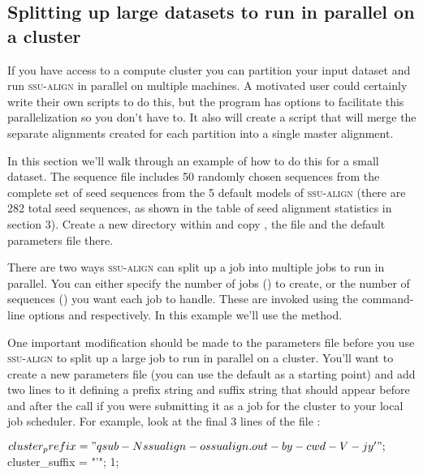 \subsection{Splitting up large datasets to run in parallel on a cluster}

If you have access to a compute cluster you can partition your input
dataset and run \textsc{ssu-align} in parallel on multiple machines. A
motivated user could certainly write their own scripts to do this, but
the  program has options to facilitate this
parallelization so you don't have to.  It also will create a script
that will merge the separate alignments created for each partition
into a single master alignment.

In this section we'll walk through an example of how to do this for a
small dataset.  The sequence file  includes
50 randomly chosen sequences from the complete set of seed sequences
from the 5 default models of \textsc{ssu-align} (there are 282 total
seed sequences, as shown in the table of seed alignment statistics in
section 3). Create a new directory within  and copy
, the file
 and the default parameters file
 there.

There are two ways \textsc{ssu-align} can split up a job into multiple
jobs to run in parallel. You can either specify the number of jobs
() to create, or the number of sequences () you
want each job to handle. These are invoked using the command-line
options  and  respectively.  In this example
we'll use the  method.

One important modification should be made to the parameters file
before you use \textsc{ssu-align} to split up a large job to run in
parallel on a cluster. You'll want to create a new parameters file
(you can use the default  as a starting point) and
add two lines to it defining a prefix string and suffix string that
should appear before and after the  call if you were
submitting it as a job for the cluster to your local job
scheduler. For example, look at the final 3 lines of the file
:

\begin{sreoutput}
$cluster_prefix = "qsub -N ssualign -o ssualign.out -b y -cwd -V -j y '";
$cluster_suffix = "'";
1;
\end{sreoutput}

